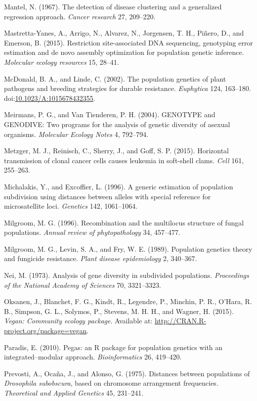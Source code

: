 \documentclass{frontiersSCNS} %
\begin{document}
Mantel, N. (1967). The detection of disease clustering and a generalized
regression approach. \emph{Cancer research} 27, 209--220.

Mastretta-Yanes, A., Arrigo, N., Alvarez, N., Jorgensen, T. H.,
Pi{\~{n}}ero, D., and Emerson, B. (2015). Restriction site-associated DNA
sequencing, genotyping error estimation and de novo assembly
optimization for population genetic inference. \emph{Molecular ecology
resources} 15, 28--41.

McDonald, B. A., and Linde, C. (2002). The population genetics of plant
pathogens and breeding strategies for durable resistance.
\emph{Euphytica} 124, 163--180.
doi:\href{http://dx.doi.org/10.1023/A:1015678432355}{10.1023/A:1015678432355}.

Meirmans, P. G., and Van Tienderen, P. H. (2004). GENOTYPE and GENODIVE:
Two programs for the analysis of genetic diversity of asexual organisms.
\emph{Molecular Ecology Notes} 4, 792--794.

Metzger, M. J., Reinisch, C., Sherry, J., and Goff, S. P. (2015).
Horizontal transmission of clonal cancer cells causes leukemia in
soft-shell clams. \emph{Cell} 161, 255--263.

Michalakis, Y., and Excoffier, L. (1996). A generic estimation of
population subdivision using distances between alleles with special
reference for microsatellite loci. \emph{Genetics} 142, 1061--1064.

Milgroom, M. G. (1996). Recombination and the multilocus structure of
fungal populations. \emph{Annual review of phytopathology} 34, 457--477.

Milgroom, M. G., Levin, S. A., and Fry, W. E. (1989). Population
genetics theory and fungicide resistance. \emph{Plant disease
epidemiology} 2, 340--367.

Nei, M. (1973). Analysis of gene diversity in subdivided populations.
\emph{Proceedings of the National Academy of Sciences} 70, 3321--3323.

Oksanen, J., Blanchet, F. G., Kindt, R., Legendre, P., Minchin, P. R.,
O'Hara, R. B., Simpson, G. L., Solymos, P., Stevens, M. H. H., and
Wagner, H. (2015). \emph{Vegan: Community ecology package}. Available
at: \url{http://CRAN.R-project.org/package=vegan}.

Paradis, E. (2010). Pegas: an R package for population genetics with an
integrated--modular approach. \emph{Bioinformatics} 26, 419--420.

Prevosti, A., Oca{\~{n}}a, J., and Alonso, G. (1975). Distances between
populations of \emph{Drosophila subobscura}, based on chromosome
arrangement frequencies. \emph{Theoretical and Applied Genetics} 45,
231--241.
\end{document}
